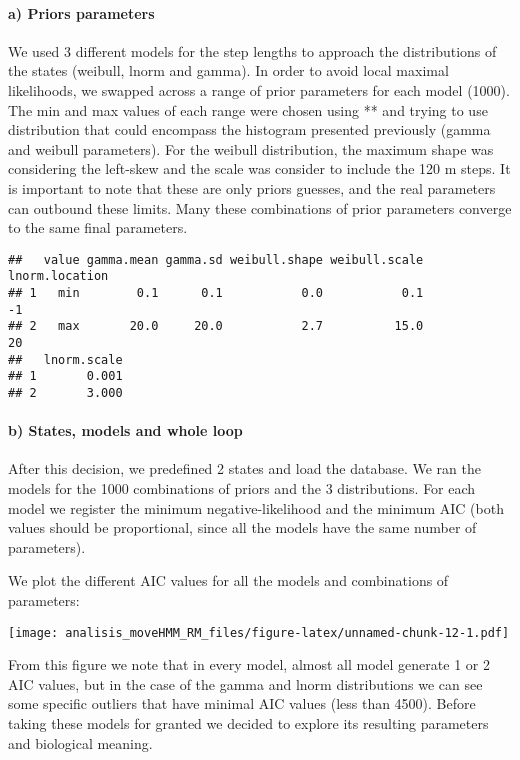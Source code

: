 \documentclass[
]{article}
\begin{document}
\hypertarget{a-priors-parameters}{%
\paragraph{a) Priors parameters}\label{a-priors-parameters}}

We used 3 different models for the step lengths to approach the
distributions of the states (weibull, lnorm and gamma). In order to
avoid local maximal likelihoods, we swapped across a range of prior
parameters for each model (1000). The min and max values of each range
were chosen using ** and trying to use distribution that could encompass
the histogram presented previously (gamma and weibull parameters). For
the weibull distribution, the maximum shape was considering the
left-skew and the scale was consider to include the 120 m steps. It is
important to note that these are only priors guesses, and the real
parameters can outbound these limits. Many these combinations of prior
parameters converge to the same final parameters.

\begin{verbatim}
##   value gamma.mean gamma.sd weibull.shape weibull.scale lnorm.location
## 1   min        0.1      0.1           0.0           0.1             -1
## 2   max       20.0     20.0           2.7          15.0             20
##   lnorm.scale
## 1       0.001
## 2       3.000
\end{verbatim}

\hypertarget{b-states-models-and-whole-loop}{%
\paragraph{b) States, models and whole
loop}\label{b-states-models-and-whole-loop}}

After this decision, we predefined 2 states and load the database. We
ran the models for the 1000 combinations of priors and the 3
distributions. For each model we register the minimum
negative-likelihood and the minimum AIC (both values should be
proportional, since all the models have the same number of parameters).

We plot the different AIC values for all the models and combinations of
parameters:

\texttt{[image: analisis\_moveHMM\_RM\_files/figure-latex/unnamed-chunk-12-1.pdf]}

From this figure we note that in every model, almost all model generate
1 or 2 AIC values, but in the case of the gamma and lnorm distributions
we can see some specific outliers that have minimal AIC values (less
than 4500). Before taking these models for granted we decided to explore
its resulting parameters and biological meaning.
\end{document}
